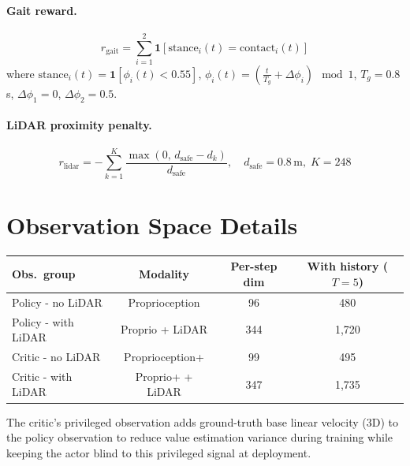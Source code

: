 \documentclass{article}
\begin{document}
\paragraph{Gait reward.}
\[
  r_\text{gait} = \sum_{i=1}^{2} \mathbf{1}\!\left[\text{stance}_i(t) = \text{contact}_i(t)\right]
\]
where $\text{stance}_i(t) = \mathbf{1}[\phi_i(t) < 0.55]$,
$\phi_i(t) = \left(\frac{t}{T_g} + \Delta\phi_i\right) \!\mod 1$,
$T_g = 0.8$\,s, $\Delta\phi_1 = 0$, $\Delta\phi_2 = 0.5$.

\paragraph{LiDAR proximity penalty.}
\[
  r_\text{lidar} = -\sum_{k=1}^{K} \frac{\max(0,\, d_\text{safe} - d_k)}{d_\text{safe}},
  \quad d_\text{safe} = 0.8\,\text{m},\; K = 248
\]

\section{Observation Space Details}
\label{app:obs}

\begin{center}
\begin{tabular}{lccc}
  \toprule
  \textbf{Obs.\ group} & \textbf{Modality} & \textbf{Per-step dim}
    & \textbf{With history ($T{=}5$)} \\
  \midrule
  Policy - no LiDAR & Proprioception & 96 & 480 \\
  Policy - with LiDAR & Proprio + LiDAR & 344 & 1{,}720 \\
  Critic - no LiDAR & Proprioception+ & 99 & 495 \\
  Critic - with LiDAR & Proprio+ + LiDAR & 347 & 1{,}735 \\
  \bottomrule
\end{tabular}
\end{center}

The critic's privileged observation adds ground-truth base linear velocity (3D)
to the policy observation to reduce value estimation variance during training
while keeping the actor blind to this privileged signal at deployment.
\end{document}
